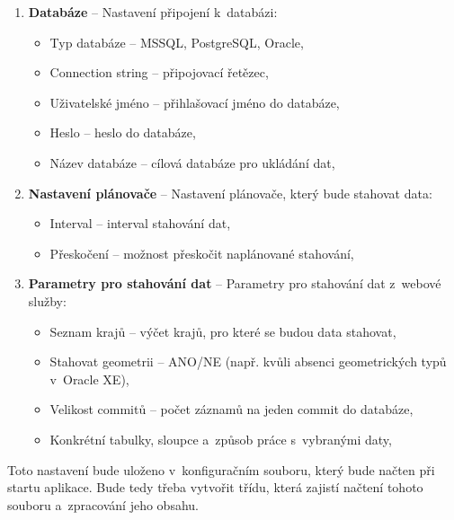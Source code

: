\begin{enumerate}
    \item \textbf{Databáze} -- Nastavení připojení k~databázi:
    \begin{itemize}
        \item Typ databáze -- MSSQL, PostgreSQL, Oracle,
        \item Connection string -- připojovací řetězec,
        \item Uživatelské jméno -- přihlašovací jméno do databáze,
        \item Heslo -- heslo do databáze,
        \item Název databáze -- cílová databáze pro ukládání dat,
    \end{itemize}

    \newpage

    \item \textbf{Nastavení plánovače} -- Nastavení plánovače, který bude stahovat data:
    \begin{itemize}
        \item Interval -- interval stahování dat,
        \item Přeskočení -- možnost přeskočit naplánované stahování,
    \end{itemize}
    
    \item \textbf{Parametry pro stahování dat} -- Parametry pro stahování dat z~webové služby:
    \begin{itemize}
        \item Seznam krajů -- výčet krajů, pro které se budou data stahovat,
        \item Stahovat geometrii -- ANO/NE (např. kvůli absenci geometrických typů v~Oracle XE),
        \item Velikost commitů -- počet záznamů na jeden commit do databáze,
        \item Konkrétní tabulky, sloupce a~způsob práce s~vybranými daty,
    \end{itemize}
\end{enumerate}

Toto nastavení bude uloženo v~konfiguračním souboru, který bude načten při startu aplikace.
Bude tedy třeba vytvořit třídu, která zajistí načtení tohoto souboru a~zpracování jeho obsahu.